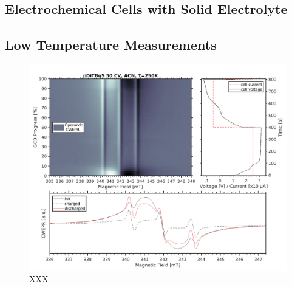 \subsection{Electrochemical Cells with Solid Electrolyte}





\subsection{Low Temperature Measurements}
\begin{figure}[h]
\center
	\includegraphics[width=1\textwidth]{./operando_epr/figures/slowcharge_231117_liquid_250K.pdf}
	\caption{XXX}
	\label{fig:operando_cold_cycle}
\end{figure}

